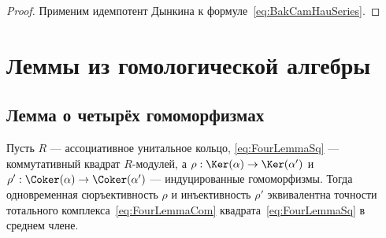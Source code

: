 \documentclass[
	extrafontsizes,
	11pt,
	hyphens,
]{memoir}
\begin{document}
\begin{proof}
Применим идемпотент Дынкина к формуле~\eqref{eq:BakCamHauSeries}.
\end{proof}




\chapter{Леммы из гомологической алгебры}


\section{Лемма о четырёх гомоморфизмах}

\begin{theorem}
\label{thm:FourLemma}
Пусть \(R\) --- ассоциативное унитальное кольцо, \eqref{eq:FourLemmaSq} --- коммутативный квадрат \(R\)-мо\-ду\-лей, а
\(\rho : \Ker(\alpha) \to \Ker(\alpha')\) и
\(\rho' : \Coker(\alpha) \to \Coker(\alpha')\) ---
индуцированные гомоморфизмы.
Тогда одновременная сюръективность \(\rho\) и инъективность \(\rho'\) эквивалентна точности тотального комплекса~\eqref{eq:FourLemmaCom} квадрата~\eqref{eq:FourLemmaSq} в среднем члене.
%

\end{theorem}
\end{document}
